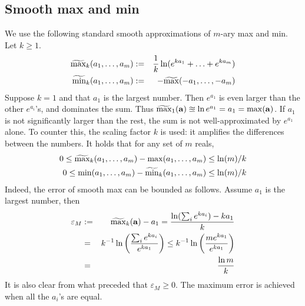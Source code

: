 \subsection{Smooth max and min}
\label{max min smoothing}
We use the following standard smooth approximations of $m$-ary max and min.
Let $k \geq 1$.
\begin{eqnarray}
	\label{eq:soft max min}
	\widetilde{\max}_k(a_1,\ldots,a_m) &:=& \frac{1}{k} \ln(e^{ka_1}+\ldots+e^{ka_m})
	\\
	\widetilde{\min}_k(a_1,\ldots,a_m) &:=& -\widetilde{\max}(-a_1,\ldots,-a_m)
\end{eqnarray}
Suppose $k=1$ and that $a_1$ is the largest number.
Then $e^{a_1}$ is even larger than the other $e^{a_i}$'s, and dominates the sum. 
Thus $\widetilde{\max}_1(\mathbf{a}) \approxeq \ln e^{a_1} = a_1 = \max(\mathbf{a})$.
If $a_1$ is not significantly larger than the rest, the sum is not well-approximated by $e^{a_1}$ alone.
To counter this, the scaling factor $k$ is used: it amplifies the differences between the numbers.
It holds that for any set of $m$ reals,
\begin{eqnarray}
\label{eq:smooth max error}
0 \leq \widetilde{\max}_k(a_1,\ldots,a_m) -\max(a_1,\ldots,a_m) \leq \ln(m)/k
\\
0 \leq \min(a_1,\ldots,a_m) -\widetilde{\min}_k(a_1,\ldots,a_m) \leq \ln(m)/k
\end{eqnarray}
Indeed, the error of smooth max can be bounded as follows.
Assume $a_1$ is the largest number, then 
\begin{eqnarray*}
\varepsilon_M &:=& \widetilde{\max}_k(\mathbf{a}) - a_1 =  \frac{\ln(\sum_ie^{ka_i})-ka_1}{k}
\\
&=& k^{-1}\ln\left(\frac{\sum_ie^{ka_i}}{e^{ka_1}}\right) \leq k^{-1}\ln \left(\frac{me^{ka_1}}{e^{ka_1}}\right)
\\
&=&\frac{\ln m}{k}
\end{eqnarray*}
It is also clear from what preceded that $\varepsilon_M \geq 0$.
The maximum error is achieved when all the $a_i$'s are equal.